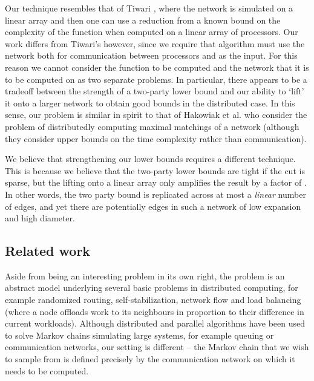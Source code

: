 \documentclass[twocolumn]{article}
\begin{document}
Our technique resembles that of Tiwari \cite{32978}, where the network is simulated on a linear array and then one can use a reduction from a known bound on the complexity of the function when computed on a linear array of processors. Our work differs from Tiwari's however, since we require that algorithm must use the network both for communication between processors and as the input. For this reason we cannot consider the function to be computed and the network that it is to be computed on as two separate problems. In particular, there appears to be a tradeoff between the strength of a two-party lower bound and our ability to `lift' it onto a larger network to obtain good bounds in the distributed case. In this sense, our problem is similar in spirit to that of Hakowiak et al. \cite{314705} who consider the problem of distributedly computing maximal matchings of a network (although they consider upper bounds on the time complexity rather than communication).

We believe that strengthening our lower bounds requires a different technique. This is because we believe that the two-party lower bounds are tight if the cut is sparse, but the lifting onto a linear array only amplifies the result by a factor of . In other words, the two party bound is replicated across at most a {\em linear} number of edges, and yet there are potentially  edges in such a network of low expansion and high diameter.

\subsection{Related work}

Aside from being an interesting problem in its own right, the problem is an
abstract model underlying several basic problems in distributed computing, for
example randomized routing, self-stabilization, network flow \cite{48689} and load balancing (where a node offloads work to its neighbours in proportion to their difference in current workloads). Although distributed and parallel algorithms have been used to solve Markov chains simulating large systems, for example queuing or communication networks, our setting is different -- the Markov chain that we wish to sample from is defined precisely by the communication network on which it needs to be computed.
\end{document}
